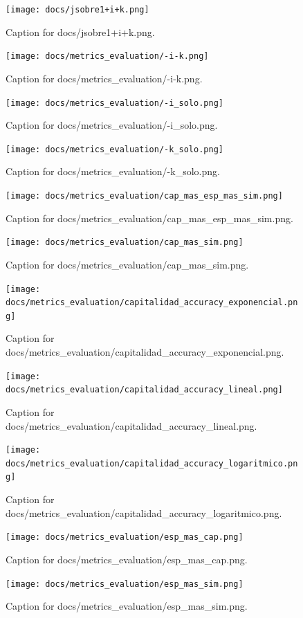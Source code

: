 \documentclass{article}
\begin{document}
\begin{figure}[h] \centering \texttt{[image: docs/jsobre1+i+k.png]} \caption{Caption for docs/jsobre1+i+k.png.} \end{figure}
\begin{figure}[h] \centering \texttt{[image: docs/metrics\_evaluation/-i-k.png]} \caption{Caption for docs/metrics_evaluation/-i-k.png.} \end{figure}
\begin{figure}[h] \centering \texttt{[image: docs/metrics\_evaluation/-i\_solo.png]} \caption{Caption for docs/metrics_evaluation/-i_solo.png.} \end{figure}
\begin{figure}[h] \centering \texttt{[image: docs/metrics\_evaluation/-k\_solo.png]} \caption{Caption for docs/metrics_evaluation/-k_solo.png.} \end{figure}
\begin{figure}[h] \centering \texttt{[image: docs/metrics\_evaluation/cap\_mas\_esp\_mas\_sim.png]} \caption{Caption for docs/metrics_evaluation/cap_mas_esp_mas_sim.png.} \end{figure}
\begin{figure}[h] \centering \texttt{[image: docs/metrics\_evaluation/cap\_mas\_sim.png]} \caption{Caption for docs/metrics_evaluation/cap_mas_sim.png.} \end{figure}
\begin{figure}[h] \centering \texttt{[image: docs/metrics\_evaluation/capitalidad\_accuracy\_exponencial.png]} \caption{Caption for docs/metrics_evaluation/capitalidad_accuracy_exponencial.png.} \end{figure}
\begin{figure}[h] \centering \texttt{[image: docs/metrics\_evaluation/capitalidad\_accuracy\_lineal.png]} \caption{Caption for docs/metrics_evaluation/capitalidad_accuracy_lineal.png.} \end{figure}
\begin{figure}[h] \centering \texttt{[image: docs/metrics\_evaluation/capitalidad\_accuracy\_logaritmico.png]} \caption{Caption for docs/metrics_evaluation/capitalidad_accuracy_logaritmico.png.} \end{figure}
\begin{figure}[h] \centering \texttt{[image: docs/metrics\_evaluation/esp\_mas\_cap.png]} \caption{Caption for docs/metrics_evaluation/esp_mas_cap.png.} \end{figure}
\begin{figure}[h] \centering \texttt{[image: docs/metrics\_evaluation/esp\_mas\_sim.png]} \caption{Caption for docs/metrics_evaluation/esp_mas_sim.png.} \end{figure}
\end{document}
